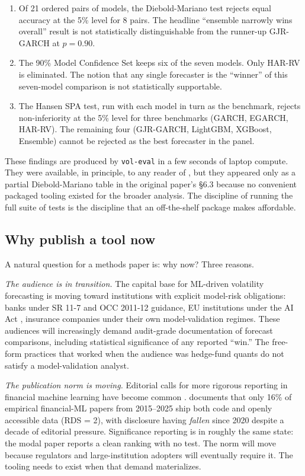 \begin{enumerate}[leftmargin=*]
    \item Of 21 ordered pairs of models, the Diebold-Mariano test rejects equal accuracy at the 5\% level for 8 pairs. The headline ``ensemble narrowly wins overall'' result is not statistically distinguishable from the runner-up GJR-GARCH at $p = 0.90$.
    \item The 90\% Model Confidence Set keeps six of the seven models. Only HAR-RV is eliminated. The notion that any single forecaster is the ``winner'' of this seven-model comparison is not statistically supportable.
    \item The Hansen SPA test, run with each model in turn as the benchmark, rejects non-inferiority at the 5\% level for three benchmarks (GARCH, EGARCH, HAR-RV). The remaining four (GJR-GARCH, LightGBM, XGBoost, Ensemble) cannot be rejected as the best forecaster in the panel.
\end{enumerate}

These findings are produced by \texttt{vol-eval} in a few seconds of laptop compute. They were available, in principle, to any reader of \citet{KhanVol2026}, but they appeared only as a partial Diebold-Mariano table in the original paper's \S6.3 because no convenient packaged tooling existed for the broader analysis. The discipline of running the full suite of tests is the discipline that an off-the-shelf package makes affordable.

\subsection{Why publish a tool now}

A natural question for a methods paper is: why now? Three reasons.

\textit{The audience is in transition.} The capital base for ML-driven volatility forecasting is moving toward institutions with explicit model-risk obligations: banks under SR 11-7 \citep{FedSR117} and OCC 2011-12 guidance, EU institutions under the AI Act \citep{EUAIAct}, insurance companies under their own model-validation regimes. These audiences will increasingly demand audit-grade documentation of forecast comparisons, including statistical significance of any reported ``win.'' The free-form practices that worked when the audience was hedge-fund quants do not satisfy a model-validation analyst.

\textit{The publication norm is moving.} Editorial calls for more rigorous reporting in financial machine learning have become common \citep{ArnottHarveyMarkowitz2019, Lopez2018}. \citet{Khan2026Survey} documents that only 16\% of empirical financial-ML papers from 2015--2025 ship both code and openly accessible data (RDS = 2), with disclosure having \emph{fallen} since 2020 despite a decade of editorial pressure. Significance reporting is in roughly the same state: the modal paper reports a clean ranking with no test. The norm will move because regulators and large-institution adopters will eventually require it. The tooling needs to exist when that demand materializes.

